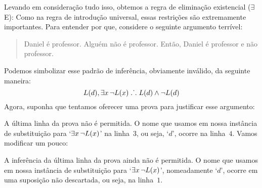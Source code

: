 Levando em considera\c c\~ao tudo isso, obtemos a regra de elimina\c c\~ao existencial ($\exists$E):
Como na regra de introdu\c c\~ao universal, essas restri\c c\~oes s\~ao extremamente importantes. Para entender por que, considere o seguinte argumento terr\'ivel:
	\begin{quote}
		Daniel \'e professor. Algu\'em n\~ao \'e professor. Ent\~ao, Daniel \'e professor e n\~ao professor.
	\end{quote}
Podemos simbolizar esse padr\~ao de infer\^encia, obviamente inv\'alido, da seguinte maneira:
$$\mathord{L}(d), \exists x\, \neg\mathord{L}(x) \mathrel{\ldotp\dot{}\,\ldotp} \mathord{L}(d) \wedge \neg \mathord{L}(d)$$
Agora, suponha que tentamos oferecer uma prova para justificar esse argumento:

\begin{fitchproof}
	\open	
	\close
\end{fitchproof}
A \'ultima linha da prova n\~ao \'e permitida. O nome que usamos em nossa inst\^ancia de substitui\c c\~ao para `$\exists x\, \neg \mathord{L}(x)$' na linha~$3$, ou seja,  `$d$', ocorre na linha~$4$. Vamos modificar um pouco:
\begin{fitchproof}
	\open	
	\close
\end{fitchproof}
A  infer\^encia da \'ultima linha da prova ainda n\~ao \'e permitida. O nome que usamos em nossa inst\^ancia de substitui\c c\~ao para `$\exists x\, \neg \mathord{L}(x)$', nomeadamente `$d$', ocorre em uma suposi\c c\~ao n\~ao descartada, ou seja, na linha~$1$.

